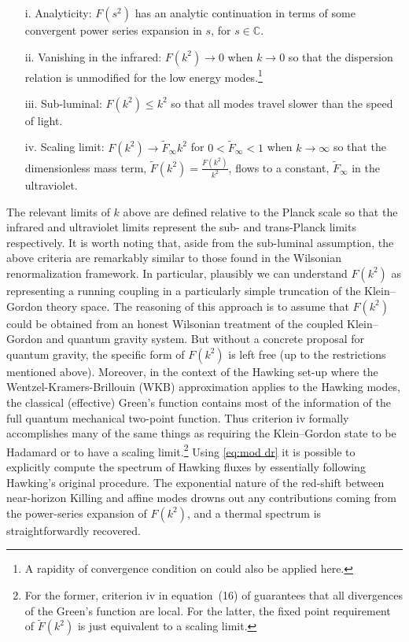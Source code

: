 \documentclass[12pt,english]{article}
\numberwithin{equation}{section}
\newcommand{\citealtbjps}[2][]{\ifthenelse{\equal{#1}{}}{\citeauthor{#2} [\citeyear{#2}]}{\citeauthor{#2} [\citeyear{#2}], #1}}
\begin{document}
\begin{enumerate}
	\item [i.] Analyticity: $F(s^2)$ has an analytic continuation in terms of some convergent power series expansion in $s$, for $s \in \mathbb C$.
	\item [ii.] \label{vanishing infrared} Vanishing in the infrared: $F(k^2) \to 0$ when $k \to 0$ so that the dispersion relation is unmodified for the low energy modes.\footnote{A rapidity of convergence condition on could also be applied here.} 
	\item [iii.] Sub-luminal: $F(k^2) \leq k^2$ so that all modes travel slower than the speed of light.
	\item [iv.] \label{scaling limit} Scaling limit: $F(k^2) \to \tilde F_\infty k^2$ for $0< \tilde F_\infty < 1$ when $k\to \infty$ so that the dimensionless mass term, $\tilde F(k^2) = \frac {F(k^2)}{k^2}$, flows to a constant, $\tilde F_\infty$ in the ultraviolet.
\end{enumerate}
The relevant limits of $k$ above are defined relative to the Planck scale so that the infrared and ultraviolet limits represent the sub- and trans-Planck limits respectively. It is worth noting that, aside from the sub-luminal assumption, the above criteria are remarkably similar to those found in the Wilsonian renormalization framework. In particular, plausibly we can understand $F(k^2)$ as representing a running coupling in a particularly simple truncation of the Klein--Gordon theory space. The reasoning of this approach is to assume that $F(k^2)$ could be obtained from an honest Wilsonian treatment of the coupled Klein--Gordon and quantum gravity system. But without a concrete proposal for quantum gravity, the specific form of $F(k^2)$ is left free (up to the restrictions mentioned above). Moreover, in the context of the Hawking set-up where the Wentzel-Kramers-Brillouin (WKB) approximation applies to the Hawking modes, the classical (effective) Green's function contains most of the information of the full quantum mechanical two-point function. Thus criterion iv formally accomplishes many of the same things as requiring the Klein--Gordon state to be Hadamard or to have a scaling limit.\footnote{For the former, criterion iv in equation~(16) of \citealtbjps{unruh:2005} guarantees that all divergences of the Green's function are local. For the latter, the fixed point requirement of $\tilde F(k^2)$ is just equivalent to a scaling limit.} Using \eqref{eq:mod dr} it is possible to explicitly compute the spectrum of Hawking fluxes by essentially following Hawking's original procedure. The exponential nature of the red-shift between near-horizon Killing and affine modes drowns out any contributions coming from the power-series expansion of $F(k^2)$, and a thermal spectrum is straightforwardly recovered. 
\end{document}
